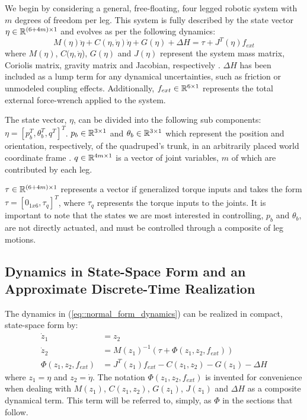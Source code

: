 
We begin by considering a general, free-floating, four legged robotic system with $m$ degrees of 
freedom per leg. This system is fully described by the state vector $\eta \in \mathbb{R}^{(6+4m)\times1}$ and 
evolves as per the following dynamics:
	\begin{equation}
		M(\eta)\ddot{\eta} + C(\eta,\dot{\eta})\dot{\eta} + G(\eta) + \Delta{H} = \tau + J^T(\eta) f_{ext}
		\label{eq::normal_form_dynamics}
	\end{equation}
where $M(\eta)$, $C(\eta,\dot{\eta}$), $G(\eta)$ and $J(\eta)$ represent the system mass matrix, 
Coriolis matrix, gravity matrix and Jacobian, respectively \cite{Wieber2006}. $\Delta{H}$ 
has been included as a lump term for any dynamical uncertainties, such as friction or 
unmodeled coupling effects. Additionally, $f_{ext} \in \mathbb{R}^{6\times1}$ represents the total external 
force-wrench applied to the system. 

The state vector, $\eta$, can be divided into the following sub components: 
$\eta = [ p_{b}^{T}, \theta_{b}^{T}, q^{T} ]^{T}$. $p_{b} \in \mathbb{R}^{3\times1}$ and 
$\theta_{b} \in \mathbb{R}^{3\times1}$ which represent the position and orientation, respectively, of the 
quadruped's trunk, in an arbitrarily placed world coordinate frame \cite{Wieber2015}.
$q \in \mathbb{R}^{4 m\times1}$ is a vector of joint  variables, $m$ of which are contributed by each leg.

$\tau \in \mathbb{R}^{(6+4m)\times1}$ represents a vector if generalized torque inputs and takes the form 
$\tau = [ 0_{1x6}, \tau_{q} ]^{T}$, where $\tau_{q}$ represents the torque inputs to the joints. 
It is important to note that the states we are most interested in controlling, $p_{b}$ and 
$\theta_{b}$, are not directly actuated, and must be controlled through a composite of leg motions.


\subsection{Dynamics in State-Space Form and an Approximate Discrete-Time Realization}


The dynamics in (\ref{eq::normal_form_dynamics}) can be realized in compact, state-space form by:
	\begin{equation}
		\begin{split}
		\dot{z}_{1} 				&= z_{2} \\
		\dot{z}_{2} 				&= M(z_{1})^{-1}(\tau + \Phi(z_{1},z_{2},f_{ext})) \\
		\Phi(z_{1},z_{2},f_{ext}) 	&= J^T(z_{1}) f_{ext} - C(z_{1},z_{2}) - G(z_{1}) - \Delta{H}
		\end{split}
		\label{eq::state_space_dynamics}
	\end{equation}
where $z_{1}=\eta$ and $z_{2}=\dot{\eta}$. The notation $\Phi(z_{1},z_{2},f_{ext})$ is invented
for convenience when dealing with $M(z_{1})$, $C(z_{1},z_{2})$, $G(z_{1})$, $J(z_{1})$ and $\Delta H$
as a composite dynamical term. This term will be referred to, simply, as $\Phi$ in the sections that follow.

